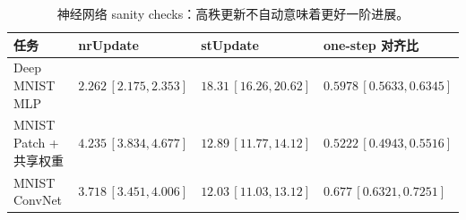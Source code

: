 \begin{table}[t]
\centering
\caption{神经网络 sanity checks：高秩更新不自动意味着更好一阶进展。}
\label{tab:e11-neural-negative}
\begin{tabular}{llll}
\toprule
任务 & nrUpdate & stUpdate & one-step 对齐比 \\
\midrule
Deep MNIST MLP & $2.262\,[2.175,2.353]$ & $18.31\,[16.26,20.62]$ & $0.5978\,[0.5633,0.6345]$ \\
MNIST Patch + 共享权重 & $4.235\,[3.834,4.677]$ & $12.89\,[11.77,14.12]$ & $0.5222\,[0.4943,0.5516]$ \\
MNIST ConvNet & $3.718\,[3.451,4.006]$ & $12.03\,[11.03,13.12]$ & $0.677\,[0.6321,0.7251]$ \\
\bottomrule
\end{tabular}
\end{table}
